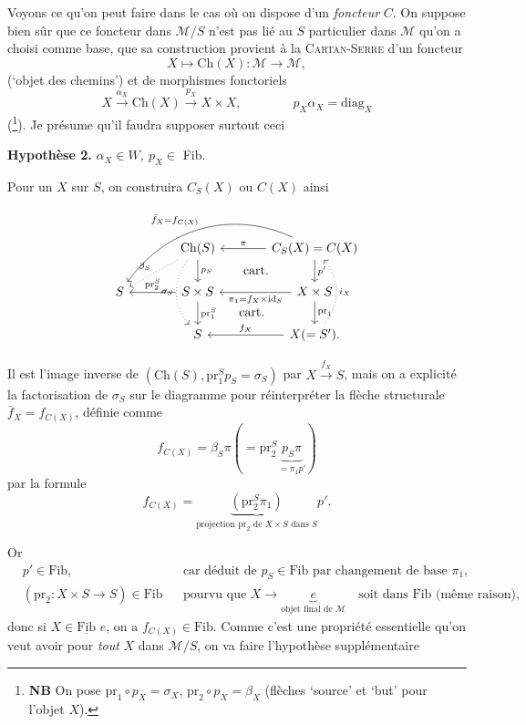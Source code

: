 \documentclass[11pt]{article}
\newcommand{\printedpage}[1]{\marginpar{\footnotesize p.~#1}}
\newcommand{\msp}[1]{\marginpar{\footnotesize [#1]}}
\newcommand{\Fib}{\underline{\mathrm{Fib}}\,}
\newcommand{\Ch}{\mathrm{Ch}}
\newcommand{\pr}{\mathrm{pr}}
\begin{document}
Voyons ce qu'on peut faire dans le cas où on dispose d'un \textit{foncteur} $C$. On suppose bien sûr que ce foncteur dans $\mathcal{M}/S$ \msp{page 101} n'est pas lié au $S$ particulier dans $\mathcal{M}$ qu'on a choisi comme base, que sa construction provient à la \textsc{Cartan-Serre} d'un foncteur
\[
X \longmapsto \mathrm{Ch}(X) : \mathcal{M} \longrightarrow \mathcal{M},
\]
(`objet des chemins') et de morphismes fonctoriels
\[
X \xrightarrow{\alpha_X} \mathrm{Ch}(X) \xrightarrow{p_X} X \times X, \qquad\qquad \boxed{p_X\alpha_X = \mathrm{diag}_X}
\]
(\footnote[58]{\textbf{NB} On pose $\mathrm{pr}_1 \circ p_X = \sigma_X$, $\mathrm{pr}_2 \circ p_X = \beta_X$ (flèches `source' et `but' pour l'objet $X$).}). Je présume qu'il faudra supposer surtout ceci

\textbf{Hypothèse 2.} \textit{$\alpha_X \in W$, $p_X \in$} Fib.

Pour un $X$ sur $S$, on construira $C_S(X)$ ou $C(X)$ ainsi

\printedpage{64}

\[
\begin{tikzcd}[column sep=large]
 & \Ch(S) \arrow[d, "p_S"] \arrow[dl, dotted, "\beta_S"'] \arrow[dd, dotted, bend right=40, "\sigma_S"'] \arrow[dr, phantom, "\text{cart.}"]
 & C_S(X)=C(X) \arrow[l, "\pi"'] \arrow[d, "p'"] \arrow[dll, bend right=40, "\bar f_X=f_{C(X)}"'] \\
S & S\times S \arrow[l, "\pr_2^S"'] \arrow[d, "\pr_1^S"] \arrow[dr, phantom, "\text{cart.}"]
 & X\times S \arrow[l, "\pi_1=f_X\times\mathrm{id}_S"] \arrow[d, "\pr_1"] \\
 & S & X(=S'). \arrow[l, "f_X"'] \arrow[uu, dotted, bend right=40, "i_X"']
\end{tikzcd}
\]

Il est l'image inverse de $(\Ch(S),\pr_1^Sp_S=\sigma_S)$ par $X\xrightarrow{f_X}S$, mais on a explicité la factorisation de $\sigma_S$ sur le diagramme pour réinterpréter la flèche structurale $\bar f_X=f_{C(X)}$, définie comme
\[
f_{C(X)}=\beta_S\pi(=\pr_2^S\underbrace{p_S\pi}_{=\pi_1p'})
\]
par la formule
\[
f_{C(X)}=\underbrace{(\pr_2^S\pi_1)}_{\text{projection } \pr_2 \text{ de } X\times S \text{ dans } S}p'.
\]

\msp{page 102}
Or
\[
\begin{aligned}
&p'\in\mathrm{Fib}, && \text{car déduit de } p_S\in\mathrm{Fib} \text{ par changement de base } \pi_1,\\
&(\pr_2 : X\times S\longrightarrow S)\in\mathrm{Fib} && \text{pourvu que } X\longrightarrow\underbrace{e}_{\text{objet final de } \mathcal{M}}\quad \text{soit dans Fib (même raison),}
\end{aligned}
\]
donc si $X\in\Fib\,e$, on a $f_{C(X)}\in\mathrm{Fib}$. Comme c'est une propriété essentielle qu'on veut avoir pour \textit{tout} $X$ dans $\mathcal{M}/S$, on va faire l'hypothèse supplémentaire
\end{document}
